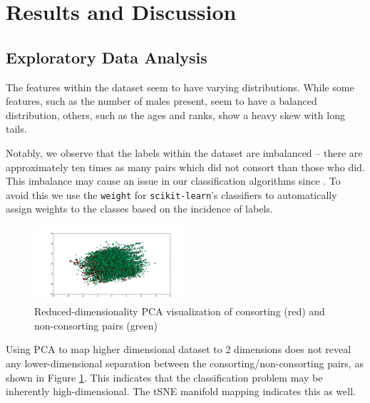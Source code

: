 \documentclass[twoside,twocolumn,paper=letter,fontsize=11pt]{article}
\begin{document}
\section{Results and Discussion}
\subsection{Exploratory Data Analysis}
The features within the dataset seem to have varying distributions. While some
features, such as the number of males present, seem to have a balanced
distribution, others, such as the ages and ranks, show a heavy skew with long
tails.

Notably, we observe that the labels within the dataset are imbalanced -- there
are approximately ten times as many pairs which did not consort than those who
did. This imbalance may cause an issue in our classification algorithms since .
To avoid this we use the \texttt{weight} for \texttt{scikit-learn}'s classifiers
to automatically assign weights to the classes based on the incidence of
labels.\\
\begin{figure}
      \centering
          \includegraphics[width=0.5\textwidth]{../figs/consort_non_consort_visualization_pca.png}
  \caption{Reduced-dimensionality PCA visualization of consorting (red) and
  non-consorting pairs (green)}
  \label{fig:pca_vis}
\end{figure}
Using PCA to map higher dimensional dataset to 2 dimensions does not reveal
any lower-dimensional separation between the consorting/non-consorting pairs, as
shown in Figure \ref{fig:pca_vis}.
This indicates that the classification problem may be inherently
high-dimensional. The tSNE manifold mapping indicates this as well.
\end{document}
